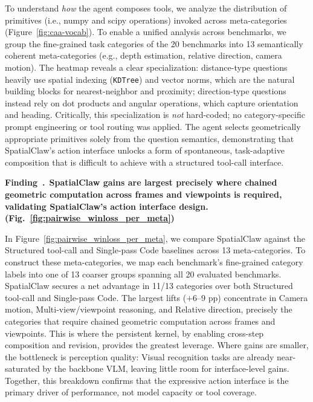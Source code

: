 \documentclass{llmxive}
\providecommand{\ours}{SpatialClaw}
\providecommand{\finding}[2]{    \refstepcounter{findingcounter}    \begin{tcolorbox}[
        colback=white!90!gray,
        colframe=ngreen,
        arc=2pt,
        boxsep=3pt,
        left=10pt,
        right=10pt,
        top=0pt,
        bottom=0pt,
        boxrule=0.8pt,
        enhanced jigsaw
    ]
        \textbf{Finding~\arabic{findingcounter}.}~\textbf{#1} #2
    \end{tcolorbox}
    \vspace{-0.1cm}
}
\begin{document}
To understand \emph{how} the agent composes tools, we analyze the distribution of primitives (i.e., numpy and scipy operations) invoked across meta-categories (Figure~\ref{fig:caa-vocab}). 
To enable a unified analysis across benchmarks, we group the fine-grained task categories of the 20 benchmarks into 13 semantically coherent meta-categories (e.g., depth estimation, relative direction, camera motion). 
The heatmap reveals a clear specialization: distance-type questions heavily use spatial indexing (\texttt{KDTree}) and vector norms, which are the natural building blocks for nearest-neighbor and proximity; direction-type questions instead rely on dot products and angular operations, which capture orientation and heading. Critically, this specialization is \emph{not} hard-coded; no category-specific prompt engineering or tool routing was applied. The agent selects geometrically appropriate primitives solely from the question semantics, demonstrating that \ours{}'s action interface unlocks a form of spontaneous, task-adaptive composition that is difficult to achieve with a structured tool-call interface.





\finding{\ours{} gains are largest precisely where chained geometric computation across frames and viewpoints is required, validating \ours{}'s action interface design. (Fig.~\ref{fig:pairwise_winloss_per_meta})}{}

In Figure~\ref{fig:pairwise_winloss_per_meta}, we compare \ours{} against the Structured tool-call and Single-pass Code baselines across 13 meta-categories. 
To construct these meta-categories, we map each benchmark's fine-grained category labels into one of 13 coarser groups spanning all 20 evaluated benchmarks.
\ours{} secures a net advantage in 11/13 categories over both Structured tool-call and Single-pass Code. 
The largest lifts ($+$6--9 pp) concentrate in Camera motion, Multi-view/viewpoint reasoning, and Relative direction, precisely the categories that require chained geometric computation across frames and viewpoints. This is where the persistent kernel, by enabling cross-step composition and revision, provides the greatest leverage. Where gains are smaller, the bottleneck is perception quality: Visual recognition tasks are already near-saturated by the backbone VLM, leaving little room for interface-level gains. Together, this breakdown confirms that the expressive action interface is the primary driver of performance, not model capacity or tool coverage.
\end{document}
